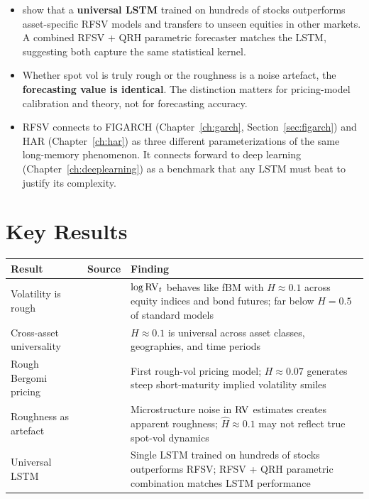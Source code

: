 \begin{itemize}[nosep]
  \item \citet{RosenbaumZhang2022} show that a \textbf{universal LSTM} trained on hundreds of stocks outperforms asset-specific RFSV models and transfers to unseen equities in other markets. A combined RFSV + QRH parametric forecaster matches the LSTM, suggesting both capture the same statistical kernel.

  \item Whether spot vol is truly rough or the roughness is a noise artefact, the \textbf{forecasting value is identical}. The distinction matters for pricing-model calibration and theory, not for forecasting accuracy.

  \item RFSV connects to FIGARCH (Chapter~\ref{ch:garch}, Section~\ref{sec:figarch}) and HAR (Chapter~\ref{ch:har}) as three different parameterizations of the same long-memory phenomenon. It connects forward to deep learning (Chapter~\ref{ch:deeplearning}) as a benchmark that any LSTM must beat to justify its complexity.
\end{itemize}


\section*{Key Results}

\begin{center}
\renewcommand{\arraystretch}{1.3}
\begin{tabular}{@{} p{3.5cm} l p{6.5cm} @{}}
\toprule
\textbf{Result} & \textbf{Source} & \textbf{Finding} \\
\midrule
Volatility is rough
  & \citet{GJR2018}
  & $\log \operatorname{RV}_t$ behaves like fBM with $H \approx 0.1$ across equity
    indices and bond futures; far below $H = 0.5$ of standard models \\[4pt]
Cross-asset universality
  & \citet{BLP2022}
  & $H \approx 0.1$ is universal across asset classes, geographies,
    and time periods \\[4pt]
Rough Bergomi pricing
  & \citet{BFG2016}
  & First rough-vol pricing model; $H \approx 0.07$ generates steep
    short-maturity implied volatility smiles \\[4pt]
Roughness as artefact
  & \citet{ContDas2024}
  & Microstructure noise in $\operatorname{RV}$ estimates creates apparent roughness;
    $\hat{H} \approx 0.1$ may not reflect true spot-vol dynamics \\[4pt]
Universal LSTM
  & \citet{RosenbaumZhang2022}
  & Single LSTM trained on hundreds of stocks outperforms RFSV;
    RFSV + QRH parametric combination matches LSTM performance \\
\bottomrule
\end{tabular}
\end{center}

